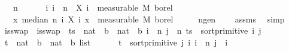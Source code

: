 \begin{isabellebody}
\ \ \ {\isachardoublequoteopen}n\ {\isasymge}\ {}{\isachardoublequoteclose}\ \isanewline
\ \ \ {\isachardoublequoteopen}{\isasymAnd}i{\isachardot}{\kern0pt}\ i\ {\isacharless}{\kern0pt}\ n\ {\isasymLongrightarrow}\ X\ i\ {\isasymin}\ measurable\ M\ borel{\isachardoublequoteclose}\isanewline
\ \ \ {\isachardoublequoteopen}{\isacharparenleft}{\kern0pt}{\isasymlambda}x{\isachardot}{\kern0pt}\ median\ n\ {\isacharparenleft}{\kern0pt}{\isasymlambda}i{\isachardot}{\kern0pt}\ X\ i\ x{\isacharparenright}{\kern0pt}{\isacharparenright}{\kern0pt}\ {\isasymin}\ measurable\ M\ borel{\isachardoublequoteclose}\isanewline
%
\isadelimproof
%
\endisadelimproof
%
\isatagproof
{}\isamarkupfalse%
\ {\isacharminus}{\kern0pt}\isanewline
\ \ \isamarkupfalse%
\ n{\isacharunderscore}{\kern0pt}ge{\isacharunderscore}{\kern0pt}{}{\isacharcolon}{\kern0pt}{\isachardoublequoteopen}n\ {\isachargreater}{\kern0pt}\ {}{\isachardoublequoteclose}\ \isamarkupfalse%
\ assms\ \isamarkupfalse%
\ simp\isanewline
\ \ \isamarkupfalse%
\ is{\isacharunderscore}{\kern0pt}swap\ \ {\isachardoublequoteopen}is{\isacharunderscore}{\kern0pt}swap\ {\isacharequal}{\kern0pt}\ {\isacharparenleft}{\kern0pt}{\isasymlambda}{\isacharparenleft}{\kern0pt}ts\ {\isacharcolon}{\kern0pt}{\isacharcolon}{\kern0pt}\ {\isacharparenleft}{\kern0pt}{\isacharparenleft}{\kern0pt}nat\ {\isasymRightarrow}\ {\isacharprime}{\kern0pt}b{\isacharparenright}{\kern0pt}\ {\isasymRightarrow}\ nat\ {\isasymRightarrow}\ {\isacharprime}{\kern0pt}b{\isacharparenright}{\kern0pt}{\isacharparenright}{\kern0pt}{\isachardot}{\kern0pt}\ {\isasymexists}i\ {\isacharless}{\kern0pt}\ n{\isachardot}{\kern0pt}\ {\isasymexists}j\ {\isacharless}{\kern0pt}\ n{\isachardot}{\kern0pt}\ ts\ {\isacharequal}{\kern0pt}\ sort{\isacharunderscore}{\kern0pt}primitive\ i\ j{\isacharparenright}{\kern0pt}{\isachardoublequoteclose}\isanewline
\ \ \isamarkupfalse%
\ t\ {\isacharcolon}{\kern0pt}{\isacharcolon}{\kern0pt}\ {\isachardoublequoteopen}{\isacharparenleft}{\kern0pt}{\isacharparenleft}{\kern0pt}nat\ {\isasymRightarrow}\ {\isacharprime}{\kern0pt}b{\isacharparenright}{\kern0pt}\ {\isasymRightarrow}\ nat\ {\isasymRightarrow}\ {\isacharprime}{\kern0pt}b{\isacharparenright}{\kern0pt}\ list{\isachardoublequoteclose}\ \isanewline
\ \ \ \ \ {\isachardoublequoteopen}t\ {\isacharequal}{\kern0pt}\ {\isacharbrackleft}{\kern0pt}sort{\isacharunderscore}{\kern0pt}primitive\ j\ i{\isachardot}{\kern0pt}\ i\ {\isacharless}{\kern0pt}{\isacharminus}{\kern0pt}\ {\isacharbrackleft}{\kern0pt}{}{\isachardot}{\kern0pt}{\isachardot}{\kern0pt}{\isacharless}{\kern0pt}n{\isacharbrackright}{\kern0pt}{\isacharcomma}{\kern0pt}\ j\ {\isacharless}{\kern0pt}{\isacharminus}{\kern0pt}\ {\isacharbrackleft}{\kern0pt}{}{\isachardot}{\kern0pt}{\isachardot}{\kern0pt}{\isacharless}{\kern0pt}i{\isacharbrackright}{\kern0pt}{\isacharbrackright}{\kern0pt}{\isachardoublequoteclose}\isanewline

\end{isabellebody}
